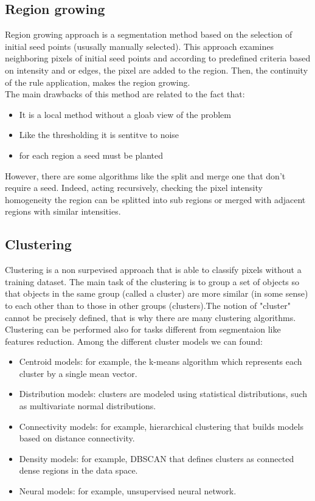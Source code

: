 \documentclass[12pt,a4paper]{report}
\begin{document}
\subsection{Region growing}

Region growing approach is a segmentation method based on the selection of initial seed points (ususally manually selected)\cite{wiki:regiongrowing}. This approach examines neighboring pixels of initial seed points and according to predefined criteria based on intensity and or edges, the pixel are added to the region. Then, the continuity of the rule application, makes the region growing\cite{Biondi}.\\
The main drawbacks of this method are related to the fact that:

\begin{itemize}[label={\textbf{*}} ]
    \item It is a local method without a gloab view of the problem
    \item Like the thresholding it is sentitve to noise
    \item for each region a seed must be planted
\end{itemize}

However, there are some algorithms like the split and merge one that don't require a seed. Indeed, acting recursively, checking the pixel intensity homogeneity the region can be splitted into sub regions or merged with adjacent regions with similar intensities\cite{wiki:regiongrowing, Biondi}.

\subsection{Clustering}

Clustering is a non surpevised approach that is able to classify pixels without a training dataset. The main task of the clustering is to group a set of objects so that objects in the same group (called a cluster) are more similar (in some sense) to each other than to those in other groups (clusters).The notion of  "cluster" cannot be precisely defined, that is why there are many clustering algorithms. Clustering can be performed also for tasks different from segmentaion like features reduction. Among the different cluster models we can found\cite{wiki:clustering}:

\begin{itemize}[label={\textbf{*}} ]
    \item Centroid models: for example, the k-means algorithm which represents each cluster by a single mean vector.
    \item Distribution models: clusters are modeled using statistical distributions, such as multivariate normal distributions.
    \item Connectivity models: for example, hierarchical clustering that builds models based on distance connectivity.
    \item Density models: for example, DBSCAN that defines clusters as connected dense regions in the data space.
    \item Neural models: for example, unsupervised neural network.
\end{itemize}
\end{document}
